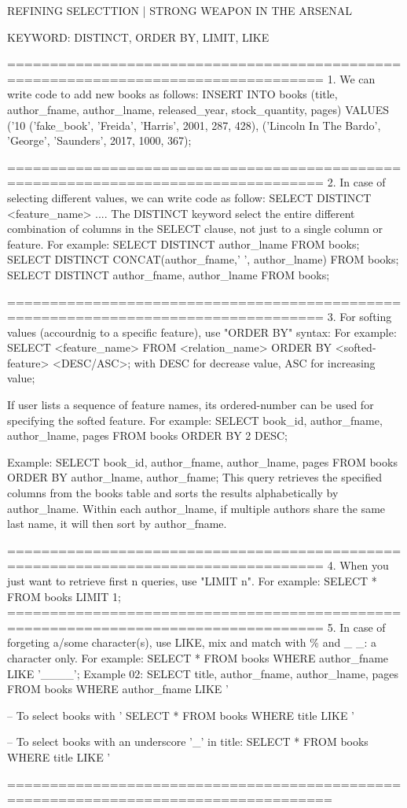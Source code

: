 REFINING SELECTTION | STRONG WEAPON IN THE ARSENAL

KEYWORD: DISTINCT, ORDER BY, LIMIT, LIKE

===================================================================================
1. We can write code to add new books as follows:
INSERT INTO books
    (title, author_fname, author_lname, released_year, stock_quantity, pages)
    VALUES ('10%
           ('fake_book', 'Freida', 'Harris', 2001, 287, 428),
           ('Lincoln In The Bardo', 'George', 'Saunders', 2017, 1000, 367);

===================================================================================
2. In case of selecting different values, we can write code as follow:
SELECT DISTINCT <feature_name> ....
The DISTINCT keyword select the entire different combination of columns in the SELECT clause, not just to a single column or feature.
For example:
    SELECT DISTINCT author_lname FROM books;
    SELECT DISTINCT CONCAT(author_fname,' ', author_lname) FROM books;
    SELECT DISTINCT author_fname, author_lname FROM books;

    
===================================================================================
3. For softing values (accourdnig to a specific feature), use "ORDER BY" syntax:
For example: 
    SELECT <feature_name> FROM <relation_name>
    ORDER BY <softed-feature> <DESC/ASC>;
with DESC for decrease value, ASC for increasing value;

If user lists a sequence of feature names, its ordered-number can be used for specifying the softed feature.
For example:
    SELECT book_id, author_fname, author_lname, pages
    FROM books
    ORDER BY 2 DESC;

Example:
    SELECT book_id, author_fname, author_lname, pages
    FROM books 
    ORDER BY author_lname, author_fname;
This query retrieves the specified columns from the books table and sorts the results alphabetically by author_lname.
Within each author_lname, if multiple authors share the same last name, it will then sort by author_fname.


===================================================================================
4. When you just want to retrieve first n queries, use "LIMIT n".
For example: 
    SELECT * FROM books LIMIT 1;
===================================================================================
5. In case of forgeting a/some character(s), use LIKE, mix and match with \% and _
_: a character only.
For example:
    SELECT * FROM books
    WHERE author_fname LIKE '____';
Example 02:
    SELECT title, author_fname, author_lname, pages 
    FROM books
    WHERE author_fname LIKE '%

-- To select books with '%
    SELECT * FROM books
    WHERE title LIKE '%
 
-- To select books with an underscore '_' in title:
    SELECT * FROM books
    WHERE title LIKE '%

====================================================================================
